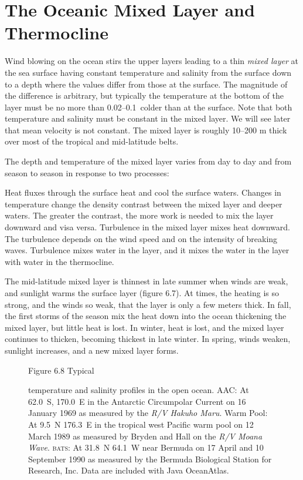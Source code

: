 \section{The Oceanic Mixed Layer and Thermocline}
Wind blowing on the ocean stirs the upper layers leading to a thin \textit{mixed
layer} at the sea surface having constant temperature and salinity
from the surface down to a depth where the values differ from those at the surface. The
magnitude of the difference is arbitrary, but typically the temperature at the bottom of the
layer must be no more than 0.02--0.1\degrees\ colder than at the surface. Note that both
temperature and salinity must be constant in the mixed layer. We will see later that mean
velocity is not constant. The mixed layer is roughly 10--200 m thick over most of the tropical
and mid-latitude belts.

The depth and temperature of the mixed layer varies from
day to day and from season to season in response to two processes:
\begin{enumerate}
\vitem Heat fluxes through the surface heat and cool the surface waters. Changes
in temperature change the density contrast between the mixed layer and deeper
waters. The greater the contrast, the more work is needed to mix the layer
downward and visa versa.
\vitem Turbulence in the mixed layer mixes heat downward. The turbulence depends on the wind speed and on the intensity of breaking waves. Turbulence mixes
water in the layer, and it mixes the water in the layer with water in the
thermocline.
\end{enumerate}

The mid-latitude mixed layer is thinnest in late summer when
winds are weak, and sunlight warms the surface layer (figure 6.7). At times, the heating is so
strong, and the winds so weak, that the layer is only a few meters thick. In fall,
the first storms of the season mix the heat down into the ocean thickening
the mixed layer, but little heat is lost. In winter, heat is lost, and the mixed
layer continues to thicken, becoming thickest in late winter. In spring, winds
weaken, sunlight increases, and a new mixed layer forms.

\begin{figure}[t!]
\footnotesize
Figure 6.8 Typical \rule{0mm}{4ex}temperature and salinity profiles in the
open ocean. AAC: At 62.0\degrees\ S, 170.0\degrees\ E in the Antarctic Circumpolar
Current on 16 January 1969 as measured by the \textit{R/V
Hakuho Maru}. Warm Pool: At 9.5\degrees\ N 176.3\degrees\ E in the tropical west Pacific warm
pool on 12 March 1989 as measured by Bryden and Hall on the \textit{R/V Moana Wave}.
\textsc{bats}: At 31.8\degrees\ N 64.1\degrees\ W near Bermuda on 17 April and 10
September 1990 as measured by the Bermuda Biological Station for Research, Inc.
Data are included with Java OceanAtlas.
\label{fig:TandSProfile}
\vspace{-5ex}
\end{figure}


